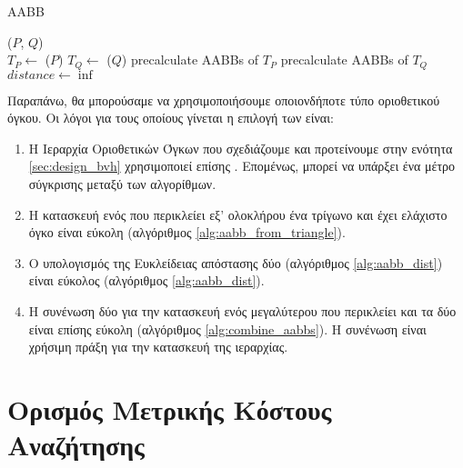 \IncMargin{1.5em}
\begin{algorithm}[h]
    \caption[Απόσταση Τριγωνικών Πλεγμάτων με Πλήρη Αναζήτηση και ]{
         AABB
        }
    \label{alg:exhaustive_search_aabb}
    \DontPrintSemicolon
    \Indm\nonl\funcname($P$, $Q$)\\
    \Indp
        $T_P \gets$ \trias($P$) \;
        $T_Q \gets$ \trias($Q$) \;
        precalculate AABBs of $T_P$\;
        precalculate AABBs of $T_Q$\; 
        $distance \gets \inf$ \;
\end{algorithm}
\DecMargin{1.5em}

Παραπάνω, θα μπορούσαμε να χρησιμοποιήσουμε οποιονδήποτε τύπο οριοθετικού όγκου.
Οι λόγοι για τους οποίους γίνεται η επιλογή των  είναι:
\begin{enumerate}
    \item Η Ιεραρχία Οριοθετικών Όγκων που σχεδιάζουμε και προτείνουμε 
    στην ενότητα \ref{sec:design_bvh} χρησιμοποιεί επίσης .
    Επομένως, μπορεί να υπάρξει ένα μέτρο σύγκρισης μεταξύ των 
    αλγορίθμων.
    \item Η κατασκευή ενός  
    που περικλείει εξ' ολοκλήρου ένα τρίγωνο και έχει ελάχιστο όγκο 
    είναι εύκολη (αλγόριθμος \ref{alg:aabb_from_triangle}).
    \item Ο υπολογισμός της Ευκλείδειας απόστασης 
    δύο  (αλγόριθμος \ref{alg:aabb_dist}) είναι 
    εύκολος (αλγόριθμος \ref{alg:aabb_dist}).
    \item Η συνένωση δύο  για την κατασκευή 
    ενός μεγαλύτερου που περικλείει και τα δύο είναι επίσης 
    εύκολη (αλγόριθμος \ref{alg:combine_aabbs}). 
    Η συνένωση είναι χρήσιμη πράξη για την κατασκευή της 
    ιεραρχίας. 
\end{enumerate}

\section{Ορισμός Μετρικής Κόστους Αναζήτησης}
\label{sec:cost_metric}

